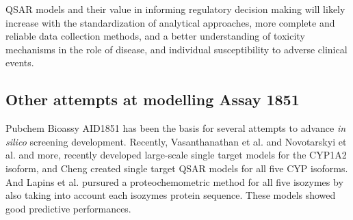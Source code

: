 

QSAR models and their value in informing regulatory decision making will likely increase with the standardization of analytical approaches, more complete and reliable data collection methods, and a better understanding of toxicity mechanisms in the role of disease, and individual susceptibility to adverse clinical events.\cite{Kruhlak2012}

\subsection{Other attempts at modelling Assay 1851}
Pubchem Bioassy AID1851 has been the basis for several attempts to advance \textit{in silico} screening development. Recently, Vasanthanathan et al. and Novotarskyi et al. and more, recently developed large-scale single target models for the CYP1A2 isoform, and Cheng created single target QSAR models for all five CYP isoforms.\cite{Vasanthanathan2012, Novotarskyi2012, Cheng2012} And Lapins et al. pursured a proteochemometric method for all five isozymes by also taking into account each isozymes protein sequence. \cite{Lapins2013} These models showed good predictive performances.


